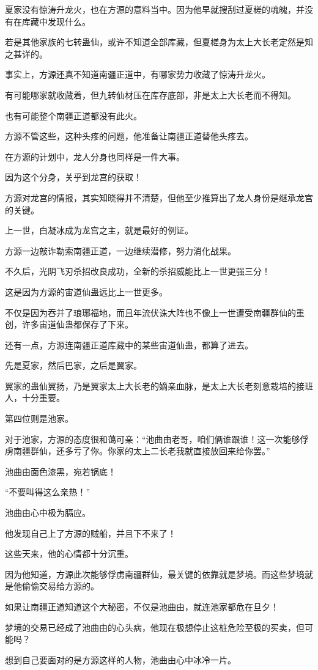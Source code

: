 \begin{this_body}
夏家没有惊涛升龙火，也在方源的意料当中。因为他早就搜刮过夏槎的魂魄，并没有在库藏中发现什么。

若是其他家族的七转蛊仙，或许不知道全部库藏，但夏槎身为太上大长老定然是知之甚详的。

事实上，方源还真不知道南疆正道中，有哪家势力收藏了惊涛升龙火。

有可能哪家就收藏着，但九转仙材压在库存底部，非是太上大长老而不得知。

也有可能整个南疆正道都没有此火。

方源不管这些，这种头疼的问题，他准备让南疆正道替他头疼去。

在方源的计划中，龙人分身也同样是一件大事。

因为这个分身，关乎到龙宫的获取！

方源对龙宫的情报，其实知晓得并不清楚，但他至少推算出了龙人身份是继承龙宫的关键。

上一世，白凝冰成为龙宫之主，就是最好的例证。

方源一边敲诈勒索南疆正道，一边继续潜修，努力消化战果。

不久后，光阴飞刃杀招改良成功，全新的杀招威能比上一世更强三分！

这是因为方源的宙道仙蛊远比上一世更多。

不仅是因为吞并了琅琊福地，而且年流伏诛大阵也不像上一世遭受南疆群仙的重创，许多宙道仙蛊都保存了下来。

还有一点，方源连南疆正道库藏中的某些宙道仙蛊，都算了进去。

先是夏家，然后巴家，之后是翼家。

翼家的蛊仙翼扬，乃是翼家太上大长老的嫡亲血脉，是太上大长老刻意栽培的接班人，十分重要。

第四位则是池家。

对于池家，方源的态度很和蔼可亲：“池曲由老哥，咱们俩谁跟谁！这一次能够俘虏南疆群仙，还多亏了你。你家的太上二长老我就直接放回来给你罢。”

池曲由面色漆黑，宛若锅底！

“不要叫得这么亲热！”

池曲由心中极为膈应。

他发现自己上了方源的贼船，并且下不来了！

这些天来，他的心情都十分沉重。

因为他知道，方源此次能够俘虏南疆群仙，最关键的依靠就是梦境。而这些梦境就是他偷偷交易给方源的。

如果让南疆正道知道这个大秘密，不仅是池曲由，就连池家都危在旦夕！

梦境的交易已经成了池曲由的心头病，他现在极想停止这桩危险至极的买卖，但可能吗？

想到自己要面对的是方源这样的人物，池曲由心中冰冷一片。

\end{this_body}

